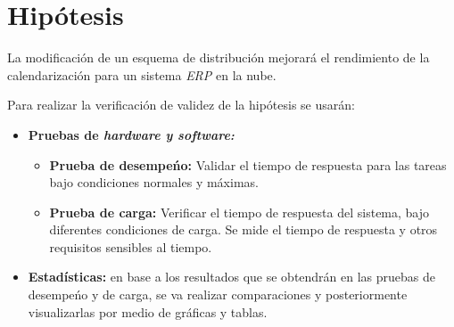\newpage

\section*{Hip\'otesis}

La modificaci\'on de un esquema de distribuci\'on mejorar\'a el rendimiento de la calendarizaci\'on para un sistema \textit{ERP} en la nube.

Para realizar la verificaci\'on de validez de la hip\'otesis se usar\'an:


\begin{itemize}
	\item \textbf{Pruebas de \textit{hardware y software:}}
	\begin{itemize}
	\item \textbf{Prueba de desempe\'no:} Validar el tiempo de respuesta para las tareas bajo condiciones normales y m\'aximas.
	\item \textbf{Prueba de carga:} Verificar el tiempo de respuesta del sistema, bajo diferentes condiciones de carga. Se mide el tiempo de respuesta y otros requisitos sensibles al tiempo.
	\end{itemize}
	\item \textbf{Estad\'isticas:} en base a los resultados que se obtendr\'an en las pruebas de desempe\'no y de carga, se va realizar comparaciones y posteriormente visualizarlas por medio de gr\'aficas y tablas.
\end{itemize}
